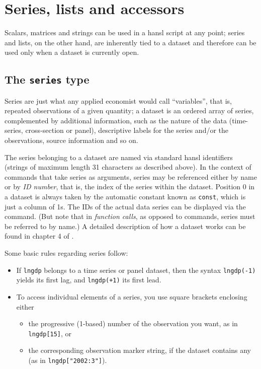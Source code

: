 \chapter{Series, lists and accessors}
\label{chap:series-etc}

Scalars, matrices and strings can be used in a hansl script at any
point; series and lists, on the other hand, are inherently tied to a
dataset and therefore can be used only when a dataset is currently
open.

\section{The \texttt{series} type}
\label{sec:series}
 
Series are just what any applied economist would call ``variables'',
that is, repeated observations of a given quantity; a dataset is an
ordered array of series, complemented by additional information,
such as the nature of the data (time-series, cross-section or panel),
descriptive labels for the series and/or the observations, source
information and so on.

The series belonging to a dataset are named via standard hansl
identifiers (strings of maximum length 31 characters as described
above). In the context of commands that take series as arguments,
series may be referenced either by name or by \emph{ID number}, that
is, the index of the series within the dataset. Position 0 in a
dataset is always taken by the automatic constant known as
\texttt{const}, which is just a column of 1s. The IDs of the actual
data series can be displayed via the  command. (But note
that in \textit{function calls}, as opposed to commands, series must
be referred to by name.)  A detailed description of how a dataset
works can be found in chapter 4 of \GUG.

Some basic rules regarding series follow:
\begin{itemize}
\item If \texttt{lngdp} belongs to a time series or panel dataset,
  then the syntax \texttt{lngdp(-1)} yields its first lag, and
  \texttt{lngdp(+1)} its first lead.
\item To access individual elements of a series, you use square
  brackets enclosing either
  \begin{itemize}
  \item the progressive (1-based) number of the observation you want,
    as in \verb|lngdp[15]|, or
  \item the corresponding observation marker string, if the dataset
    contains any (as in \verb|lngdp["2002:3"]|).
  \end{itemize}
\end{itemize}

